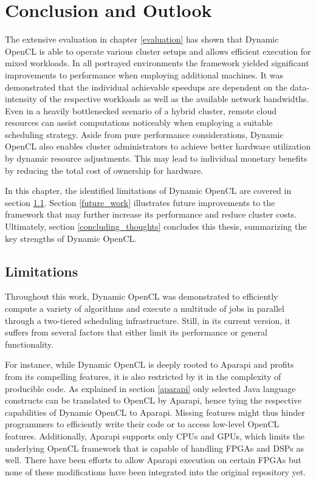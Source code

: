 \chapter{Conclusion and Outlook}
\label{conclusion}
The extensive evaluation in chapter \ref{evaluation} has shown that Dynamic OpenCL is able to operate various cluster setups and allows efficient execution for mixed workloads. In all portrayed environments the framework yielded significant improvements to performance when employing additional machines. It was demonstrated that the individual achievable speedups are dependent on the data-intensity of the respective workloads as well as the available network bandwidths. Even in a heavily bottlenecked scenario of a hybrid cluster, remote cloud resources can assist computations noticeably when employing a suitable scheduling strategy. Aside from pure performance considerations, Dynamic OpenCL also enables cluster administrators to achieve better hardware utilization by dynamic resource adjustments. This may lead to individual monetary benefits by reducing the total cost of ownership for hardware.

In this chapter, the identified limitations of Dynamic OpenCL are covered in section \ref{limitations}. Section \ref{future_work} illustrates future improvements to the framework that may further increase its performance and reduce cluster costs. Ultimately, section \ref{concluding_thoughts} concludes this thesis, summarizing the key strengths of Dynamic OpenCL.

\section{Limitations}
\label{limitations}
Throughout this work, Dynamic OpenCL was demonstrated to efficiently compute a variety of algorithms and execute a multitude of jobs in parallel through a two-tiered scheduling infrastructure. Still, in its current version, it suffers from several factors that either limit its performance or general functionality.

For instance, while Dynamic OpenCL is deeply rooted to Aparapi and profits from its compelling features, it is also restricted by it in the complexity of producible code. As explained in section \ref{aparapi} only selected Java language constructs can be translated to OpenCL by Aparapi, hence tying the respective capabilities of Dynamic OpenCL to Aparapi. Missing features might thus hinder programmers to efficiently write their code or to access low-level OpenCL features. Additionally, Aparapi supports only CPUs and GPUs, which limits the underlying OpenCL framework that is capable of handling FPGAs and DSPs as well. There have been efforts to allow Aparapi execution on certain FPGAs but none of these modifications have been integrated into the original repository yet\cite{aparapi_ucores}.


